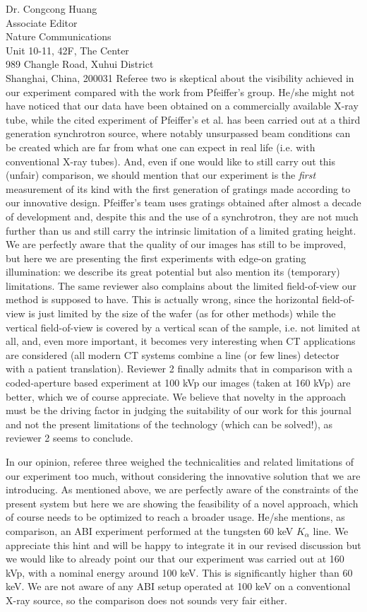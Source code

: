 \documentclass[a4paper,english]{scrlttr2}
\begin{document}
\begin{letter}{Dr. Congcong Huang\\

Associate Editor\\
Nature Communications \\

Unit 10-11, 42F, The Center\\
989 Changle Road, Xuhui District\\
Shanghai, China, 200031}
Referee two is skeptical about the visibility achieved in our experiment
compared with the work from Pfeiffer's group. He/she might not have noticed
that our data have been obtained on a commercially available X-ray tube,
while the cited experiment of Pfeiffer's et al. has been carried out at a
third generation synchrotron source, where notably unsurpassed beam
conditions can be created which are far from what one can expect in real
life (i.e. with conventional X-ray tubes). And, even if one would like to
still carry out this (unfair) comparison, we should mention that our
experiment is the \emph{first} measurement of its kind with the first generation of gratings made according to our innovative design. Pfeiffer's team uses gratings obtained after almost a decade of development and, despite this and the use of a synchrotron, they are not much further than us and still carry the intrinsic limitation of a limited grating height. We are perfectly aware that the quality of our images has still to be improved, but here we are presenting the first experiments with edge-on grating illumination: we describe its great potential but also mention its (temporary) limitations. The same reviewer also complains about the limited field-of-view our method is supposed to have. This is actually wrong, since the horizontal field-of-view is just limited by the size of the wafer (as for other methods) while the vertical field-of-view is covered by a vertical scan of the sample, i.e. not limited at all, and, even more important, it becomes very interesting when CT applications are considered (all modern CT systems combine a line (or few lines) detector with a patient translation). Reviewer 2 finally admits that in comparison with a coded-aperture based experiment at 100 kVp our images (taken at 160 kVp) are better, which we of course appreciate. We believe that novelty in the approach must be the driving factor in judging the suitability of our work for this journal and not the present limitations of the technology (which can be solved!), as reviewer 2 seems to conclude.

In our opinion, referee three weighed the technicalities and related
limitations of our experiment too much, without considering the innovative
solution that we are introducing. As mentioned above, we are perfectly aware
of the constraints of the present system but here we are showing the
feasibility of a novel approach, which of course needs to be optimized to
reach a broader usage. He/she mentions, as comparison, an ABI experiment
performed at the tungsten 60 keV $K_\alpha$ line. We appreciate this hint and will be happy to integrate it in our revised discussion but we would like to already point our that our experiment was carried out at 160 kVp, with a nominal energy around 100 keV. This is significantly higher than 60 keV. We are not aware of any ABI setup operated at 100 keV on a conventional X-ray source, so the comparison does not sounds very fair either.


\end{letter}
\end{document}

